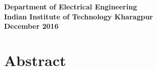 \documentclass[a4paper,11pt,titlepage,drop]{article}%
\begin{document}
\begin{center}
    \Large\bfseries
    Department of Electrical Engineering\\
    Indian Institute of Technology Kharagpur \\
    December 2016
\end{center}
%
%
%
%
%
%
%
%
%

\newpage
\thispagestyle{empty}
\onehalfspacing

\section*{Abstract}
\end{document}
